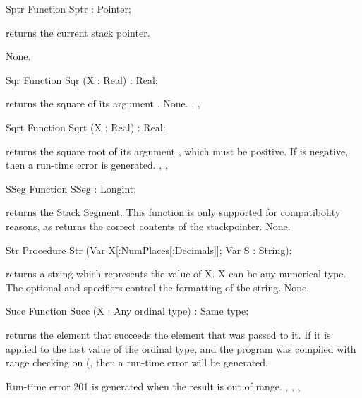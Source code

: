 \documentclass{report}
\begin{document}
\html{}
\begin{function}{Sptr}
\Declaration
Function Sptr  : Pointer;

\Description
{} returns the current stack pointer.

\Errors
None.
\SeeAlso

\end{function}
\html{}
\begin{function}{Sqr}
\Declaration
Function Sqr (X : Real) : Real;

\Description
{} returns the square of its argument .
\Errors
None.
\SeeAlso
{}, , 
\end{function}
\html{}
\begin{function}{Sqrt}
\Declaration
Function Sqrt (X : Real) : Real;

\Description
{} returns the square root of its argument , which must be
positive.
\Errors
If  is negative, then a run-time error is generated.
\SeeAlso
{}, , 
\end{function}
\html{}
\begin{function}{SSeg}
\Declaration
Function SSeg  : Longint;

\Description
  returns the Stack Segment. This function is only
 supported for compatibolity reasons, as  returns the
correct contents of the stackpointer.
\Errors
None.
\SeeAlso
{}
\end{function}
\html{}
\begin{procedure}{Str}
\Declaration
Procedure Str (Var X[:NumPlaces[:Decimals]]; Var S : String);

\Description
{} returns a string which represents the value of X. X can be any
numerical type.
The optional  and  specifiers control the
formatting of the string.
\Errors
None.
\SeeAlso
{}
\end{procedure}
\html{}
\begin{function}{Succ}
\Declaration
Function Succ (X : Any ordinal type) : Same type;

\Description
  returns the element that succeeds the element that was passed
to it. If it is applied to the last value of the ordinal type, and the
program was compiled with range checking on (, then a run-time
error will be generated.

\Errors
Run-time error 201 is generated when the result is out of
range.
\SeeAlso
{}, , , 
\end{function}
\end{document}
